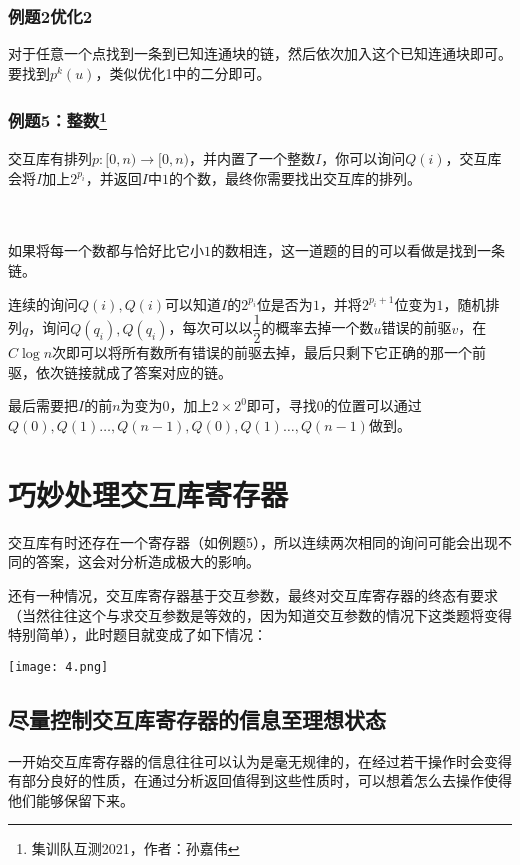 \documentclass{noithesis}
\begin{document}
\subsubsection{例题2优化2}

对于任意一个点找到一条到已知连通块的链，然后依次加入这个已知连通块即可。要找到$p^k(u)$，类似优化1中的二分即可。

\subsubsection{例题5：整数\footnote{集训队互测2021，作者：孙嘉伟}}

交互库有排列$p:[0,n)\rightarrow[0,n)$，并内置了一个整数$I$，你可以询问$Q(i)$，交互库会将$I$加上$2^{p_i}$，并返回$I$中$1$的个数，最终你需要找出交互库的排列。

\paragraph{}\

如果将每一个数都与恰好比它小$1$的数相连，这一道题的目的可以看做是找到一条链。

连续的询问$Q(i),Q(i)$可以知道$I$的$2^{p_i}$位是否为$1$，并将$2^{p_i+1}$位变为$1$，随机排列$q$，询问$Q(q_i),Q(q_i)$，每次可以以$\dfrac 12$的概率去掉一个数$u$错误的前驱$v$，在$C\log n$次即可以将所有数所有错误的前驱去掉，最后只剩下它正确的那一个前驱，依次链接就成了答案对应的链。

最后需要把$I$的前$n$为变为$0$，加上$2\times 2^0$即可，寻找$0$的位置可以通过$Q(0),Q(1)\dots,Q(n-1),Q(0),Q(1)\dots,Q(n-1)$做到。

\section{巧妙处理交互库寄存器}

交互库有时还存在一个寄存器（如例题5），所以连续两次相同的询问可能会出现不同的答案，这会对分析造成极大的影响。

还有一种情况，交互库寄存器基于交互参数，最终对交互库寄存器的终态有要求（当然往往这个与求交互参数是等效的，因为知道交互参数的情况下这类题将变得特别简单），此时题目就变成了如下情况：

\texttt{[image: 4.png]}

\subsection{尽量控制交互库寄存器的信息至理想状态}

一开始交互库寄存器的信息往往可以认为是毫无规律的，在经过若干操作时会变得有部分良好的性质，在通过分析返回值得到这些性质时，可以想着怎么去操作使得他们能够保留下来。
\end{document}
